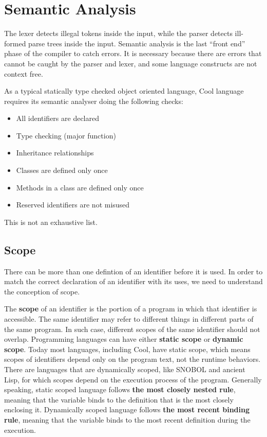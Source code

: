 \ifx\PREAMBLE\undefined


\fi
\chapter{Semantic Analysis}
The lexer detects illegal tokens inside the input, while the parser detects ill-formed parse trees inside the input. Semantic analysis is the last ``front end'' phase of the compiler to catch errors. It is necessary because there are errors that cannot be caught by the parser and lexer, and some language constructs are not context free. 

As a typical statically type checked object oriented language, Cool language requires its semantic analyser doing the following checks:
\begin{itemize}
\item All identifiers are declared
\item Type checking (major function)
\item Inheritance relationships
\item Classes are defined only once
\item Methods in a class are defined only once
\item Reserved identifiers are not misused
\end{itemize} 
This is not an exhaustive list.
\section{Scope}
There can be more than one defintion of an identifier before it is used. In order to match the correct declaration of an identifier with its uses, we need to understand the conception of scope. 

The {\bf scope} of an identifier is the portion of a program in which that identifier is accessible. The same identifier may refer to different things in different parts of the same program. In such case, different scopes of the same identifier should not overlap. Programming languages can have either {\bf static scope} or {\bf dynamic scope}. Today most languages, including Cool, have static scope, which means scopes of identifiers depend only on the program text, not the runtime behaviors. There are languages that are dynamically scoped, like SNOBOL and ancient Lisp, for which scopes depend on the execution process of the program. Generally speaking, static scoped language follows {\bf the most closely nested rule}, meaning that the variable binds to the definition that is the most closely enclosing it. Dynamically scoped language follows {\bf the most recent binding rule}, meaning that the variable binds to the most recent definition during the execution.

